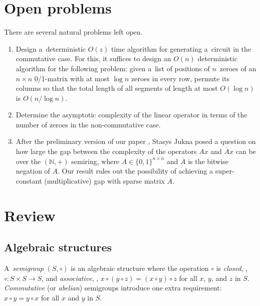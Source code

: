 \documentclass{toc}
\begin{document}
\section{Open problems}
There are several natural problems left open.
\begin{enumerate}
\item Design a~deterministic $O(z)$ time algorithm for generating
a~circuit in the commutative case.
For this, it suffices to design an $O(n)$ deterministic algorithm for the
following problem: given a~list of positions of $n$~zeroes of an $n \times n$
0/1-matrix with at most $\log n$ zeroes in every row, permute its columns so
that the total length of all segments of length at most $O(\log n)$ is
$O(n/\log n)$.
\item Determine the asymptotic complexity of the linear operator in terms of the number of zeroes in the non-commutative case.
\item After the preliminary version of our paper
\cite{conf-version}, %
Stasys Jukna posed a question on how large %
the gap between the complexity of the operators $Ax$ and $\overline{A}x$ can be over
the  %
$(\mathbb{N},+)$ semiring, where $A \in \{0,1\}^{n\times n}$ and $\overline{A}$ is
the bitwise %
negation of $A$. Our result rules out the possibility of achieving
a  %
super-constant (multiplicative) gap with sparse matrix $A$.

\end{enumerate}



\appendix
\section{Review}

\subsection{Algebraic structures}\label{subsec:algstr}

A~\emph{semigroup} $(S, \circ)$ is an algebraic structure where the operation
$\circ$ is \emph{closed}, \ie, $\circ : S\times S \rightarrow S$, and
\emph{associative}, \ie,
$x \circ (y \circ z) = (x \circ y) \circ z$ for all $x$, $y$, and $z$ in $S$.
\emph{Commutative} (or \emph{abelian}) semigroups introduce one extra
requirement: $x \circ y = y \circ x$ for all $x$ and $y$ in $S$.
\end{document}
